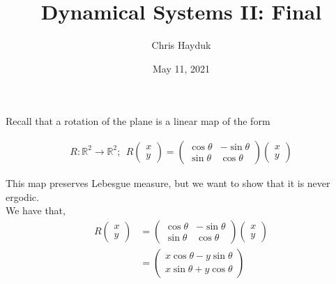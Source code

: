 \documentclass[12pt]{article}
\newenvironment{problem}[2][Problem]{\begin{trivlist}
\item[\hskip \labelsep {\bfseries #1}\hskip \labelsep {\bfseries #2.}]}{\end{trivlist}}
\begin{document}
\title{Dynamical Systems II: Final}

\author{Chris Hayduk}
\date{May 11, 2021}

\maketitle

\begin{problem}{1}
\end{problem}

Recall that a rotation of the plane is a linear map of the form

\begin{align*}
R: \mathbb{R}^2 \to \mathbb{R}^2; \ \ R \begin{pmatrix}
x \\ y
\end{pmatrix} = \begin{pmatrix}
\cos \theta & -\sin \theta\\
\sin \theta & \cos \theta
\end{pmatrix} \begin{pmatrix}
x \\ y
\end{pmatrix}
\end{align*}

This map preserves Lebesgue measure, but we want to show that it is never ergodic.\\

We have that,
\begin{align*}
R \begin{pmatrix}
x \\ y
\end{pmatrix} &= \begin{pmatrix}
\cos \theta & -\sin \theta\\
\sin \theta & \cos \theta
\end{pmatrix} \begin{pmatrix}
x \\ y
\end{pmatrix}\\
&= \begin{pmatrix}
x \cos \theta - y \sin \theta \\ x \sin \theta + y \cos \theta
\end{pmatrix}
\end{align*}
\end{document}
